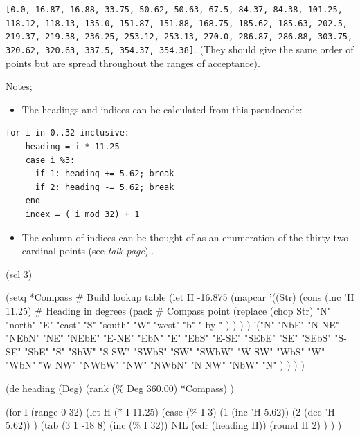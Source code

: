 \texttt{{[}0.0, 16.87, 16.88, 33.75, 50.62, 50.63, 67.5, 84.37, 84.38, 101.25, 118.12, 118.13, 135.0, 151.87, 151.88, 168.75, 185.62, 185.63, 202.5, 219.37, 219.38, 236.25, 253.12, 253.13, 270.0, 286.87, 286.88, 303.75, 320.62, 320.63, 337.5, 354.37, 354.38{]}}.
(They should give the same order of points but are spread throughout the
ranges of acceptance).

Notes;

\begin{itemize}
\item
  The headings and indices can be calculated from this pseudocode:
\end{itemize}

\begin{verbatim}
for i in 0..32 inclusive:
    heading = i * 11.25
    case i %3:
      if 1: heading += 5.62; break
      if 2: heading -= 5.62; break
    end
    index = ( i mod 32) + 1
\end{verbatim}

\begin{itemize}
\item The column of indices can be thought of as an enumeration of the
  thirty two cardinal points (see \emph{talk page})..
\end{itemize}


\begin{wideverbatim}

(scl 3)

(setq *Compass                      # Build lookup table
   (let H -16.875
      (mapcar
         '((Str)
            (cons
               (inc 'H 11.25)       # Heading in degrees
               (pack                # Compass point
                  (replace (chop Str)
                     "N" "north"
                     "E" "east"
                     "S" "south"
                     "W" "west"
                     "b" " by " ) ) ) )
         '("N" "NbE" "N-NE" "NEbN" "NE" "NEbE" "E-NE" "EbN"
            "E" "EbS" "E-SE" "SEbE" "SE" "SEbS" "S-SE" "SbE"
            "S" "SbW" "S-SW" "SWbS" "SW" "SWbW" "W-SW" "WbS"
            "W" "WbN" "W-NW" "NWbW" "NW" "NWbN" "N-NW" "NbW"
            "N" ) ) ) )

(de heading (Deg)
   (rank (\% Deg 360.00) *Compass) )

(for I (range 0 32)
   (let H (* I 11.25)
      (case (\% I 3)
         (1 (inc 'H 5.62))
         (2 (dec 'H 5.62)) )
      (tab (3 1 -18 8)
         (inc (\% I 32))
         NIL
         (cdr (heading H))
         (round H 2) ) ) )

\end{wideverbatim}

